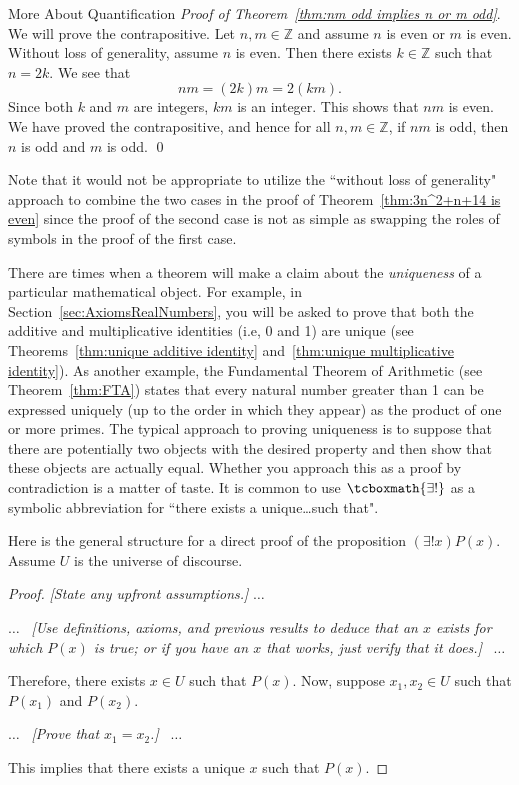 \begin{section}{More About Quantification}
\noindent \emph{Proof of Theorem~\ref{thm:nm odd implies n or m odd}}. We will prove the contrapositive.  Let $n,m\in\mathbb{Z}$ and assume $n$ is even or $m$ is even. Without loss of generality, assume $n$ is even.  Then there exists $k\in\mathbb{Z}$ such that $n=2k$. We see that
\[
nm=(2k)m=2(km).
\]
Since both $k$ and $m$ are integers, $km$ is an integer. This shows that $nm$ is even. We have proved the contrapositive, and hence for all $n,m\in\mathbb{Z}$, if $nm$ is odd, then $n$ is odd and $m$ is odd. \qed

Note that it would not be appropriate to utilize the ``without loss of generality" approach to combine the two cases in the proof of Theorem~\ref{thm:3n^2+n+14 is even} since the proof of the second case is not as simple as swapping the roles of symbols in the proof of the first case.

There are times when a theorem will make a claim about the \emph{uniqueness} of a particular mathematical object.  For example, in Section~\ref{sec:AxiomsRealNumbers}, you will be asked to prove that both the additive and multiplicative identities (i.e, 0 and 1) are unique (see Theorems~\ref{thm:unique additive identity} and~\ref{thm:unique multiplicative identity}). As another example, the Fundamental Theorem of Arithmetic (see Theorem~\ref{thm:FTA}) states that every natural number greater than 1 can be expressed uniquely (up to the order in which they appear) as the product of one or more primes. The typical approach to proving uniqueness is to suppose that there are potentially two objects with the desired property and then show that these objects are actually equal. Whether you approach this as a proof by contradiction is a matter of taste. It is common to use $\tcboxmath{\exists!}$ as a symbolic abbreviation for ``there exists a unique\ldots such that".

\begin{skeleton}\label{skeleton:uniqueness}
Here is the general structure for a direct proof of the proposition $(\exists! x)P(x)$. Assume $U$ is the universe of discourse.

\begin{mdframed}[style=skeleton]
\begin{proof}
\emph{[State any upfront assumptions.]} $\ldots$ 
\begin{center}
$\ldots$ \ \emph{[Use definitions, axioms, and previous results to deduce that an $x$ exists for which $P(x)$ is true; or if you have an $x$ that works, just verify that it does.]} \ $\ldots$ 
\end{center}
\noindent Therefore, there exists $x\in U$ such that $P(x)$. Now, suppose $x_1,x_2\in U$ such that $P(x_1)$ and $P(x_2)$.
\begin{center}
$\ldots$ \ \emph{[Prove that $x_1=x_2$.]} \ $\ldots$ 
\end{center}
This implies that there exists a unique $x$ such that $P(x)$.
\end{proof}
\end{mdframed}
\end{skeleton}


\end{section}
